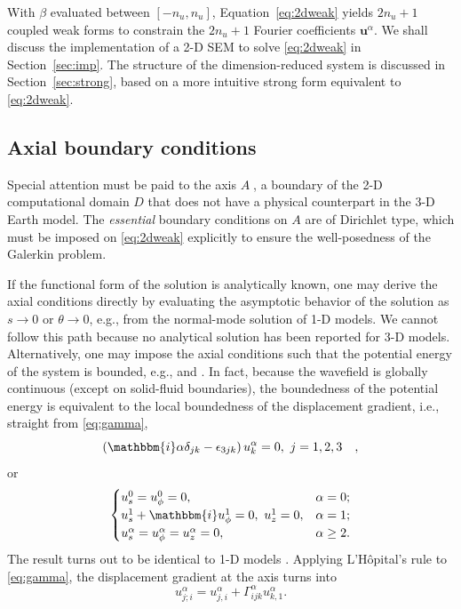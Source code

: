 \documentclass[extra,referee]{gji}
\begin{document}
With $\beta$ evaluated between $[-n_u,n_u]$, Equation~\eqref{eq:2dweak} yields
$2n_u+1$ coupled weak forms to constrain the $2n_u+1$ Fourier coefficients 
$\mathbf{u}^\alpha$. We shall discuss the implementation of a 2-D SEM to solve
\eqref{eq:2dweak} in Section~\ref{sec:imp}. 
The structure of the dimension-reduced system is discussed in 
Section~\ref{sec:strong}, based on a more intuitive strong form
equivalent to \eqref{eq:2dweak}.   

\subsection{Axial boundary conditions}
Special attention must be paid to the axis $A$􏰁, a boundary of the 2-D 
computational domain $D$ that does not have a physical counterpart 
in the 3-D Earth model. The \textit{essential} boundary conditions on
$A$ are of Dirichlet type, which must be imposed on \eqref{eq:2dweak} 
explicitly to ensure the well-posedness of the Galerkin problem. 

If the functional form of the solution is analytically known, one may
derive the axial conditions directly by evaluating the asymptotic
behavior of the solution as $s\rightarrow0$ or $\theta\rightarrow0$, e.g., 
\cite{nissen2007axisem} from the normal-mode solution of 1-D models. 
We cannot follow this path because no analytical solution has been reported 
for 3-D models. Alternatively, one may impose the axial conditions such 
that the potential energy of the system is bounded, e.g.,
\cite{lopez1998efficient} and \cite{fournier2005fourier}. 
In fact, because the wavefield is globally continuous (except on 
solid-fluid boundaries), the boundedness of 
the potential energy is equivalent to the local boundedness of the 
displacement gradient, i.e., straight from \eqref{eq:gamma},
\begin{equation}
  \left(\mathbbm{i}\alpha\delta_{jk}-\epsilon_{3jk}\right) u_k^\alpha=0,\ j=1,2,3\quad,
  \label{eq:axbd}
\end{equation}
or 
\begin{equation}
  \begin{cases}
    u_s^0=u_\phi^0=0, & \alpha=0; \\
    u_s^1+\mathbbm{i}u_\phi^1=0,\ u_z^1=0, & \alpha=1; \\
    u_s^\alpha=u_\phi^\alpha=u_z^\alpha=0, & \alpha\ge2.
  \end{cases}
  \label{eq:mask}
\end{equation}
The result turns out to be identical to 1-D models \cite[]{nissen2007axisem}. 
Applying L'H\^opital's rule to \eqref{eq:gamma}, the displacement gradient 
at the axis turns into
\begin{equation}
  u_{j;i}^\alpha = u_{j,i}^\alpha+
  \Gamma_{ijk}^\alpha u_{k,1}^\alpha.
  \label{eq:axigrad_u}
\end{equation} 
  
\end{document}
